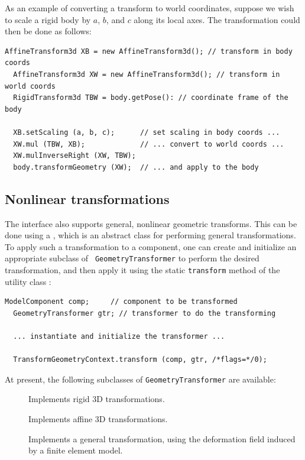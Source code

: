 As an example of converting a transform to world coordinates, suppose
we wish to scale a rigid body by $a$, $b$, and $c$ along its local
axes. The transformation could then be done as follows:
%
\begin{lstlisting}[]
  AffineTransform3d XB = new AffineTransform3d(); // transform in body coords
  AffineTransform3d XW = new AffineTransform3d(); // transform in world coords
  RigidTransform3d TBW = body.getPose(): // coordinate frame of the body

  XB.setScaling (a, b, c);      // set scaling in body coords ...
  XW.mul (TBW, XB);             // ... convert to world coords ...
  XW.mulInverseRight (XW, TBW); 
  body.transformGeometry (XW);  // ... and apply to the body
\end{lstlisting}
%

\subsection{Nonlinear transformations}

The 
interface also supports general, nonlinear geometric transforms.
This can be done using a
, which is an
abstract class for performing general transformations.  To apply such
a transformation to a component, one can create and initialize an appropriate
subclass of {\tt
GeometryTransformer} to perform the desired transformation, and
then apply it using the static {\tt transform} method of the utility class 
:
%
\begin{lstlisting}[]
  ModelComponent comp;     // component to be transformed
  GeometryTransformer gtr; // transformer to do the transforming

  ... instantiate and initialize the transformer ...

  TransformGeometryContext.transform (comp, gtr, /*flags=*/0);
\end{lstlisting}
%

At present, the following subclasses of {\tt GeometryTransformer} are
available:

\begin{description}

\item[]\mbox{}

Implements rigid 3D transformations.

\item[]\mbox{}

Implements affine 3D transformations.

\item[]\mbox{}

Implements a general transformation, using the deformation field
induced by a finite element model. 

\end{description}

